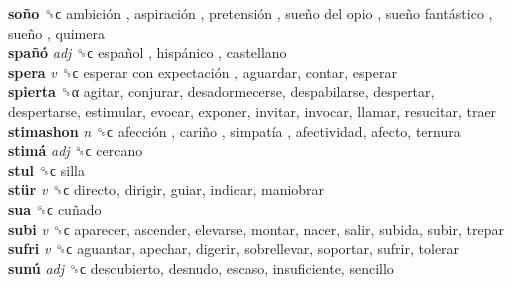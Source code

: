 \textbf{soño} ␝ϲ   ambición ,  aspiración ,  pretensión ,  sueño del opio ,  sueño fantástico ,  sueño , quimera  \\
\textbf{spañó} \emph{adj}  ␝ϲ   español ,  hispánico , castellano  \\
\textbf{spera} \emph{v}  ␝ϲ   esperar con expectación , aguardar, contar, esperar  \\
\textbf{spierta} ␝α  agitar, conjurar, desadormecerse, despabilarse, despertar, despertarse, estimular, evocar, exponer, invitar, invocar, llamar, resucitar, traer  \\
\textbf{stimashon} \emph{n}  ␝ϲ   afección ,  cariño ,  simpatía , afectividad, afecto, ternura  \\
\textbf{stimá} \emph{adj}  ␝ϲ  cercano  \\
\textbf{stul} ␝ϲ  silla  \\
\textbf{stür} \emph{v}  ␝ϲ  directo, dirigir, guiar, indicar, maniobrar  \\
\textbf{sua} ␝ϲ   cuñado   \\
\textbf{subi} \emph{v}  ␝ϲ  aparecer, ascender, elevarse, montar, nacer, salir, subida, subir, trepar  \\
\textbf{sufri} \emph{v}  ␝ϲ  aguantar, apechar, digerir, sobrellevar, soportar, sufrir, tolerar  \\
\textbf{sunú} \emph{adj}  ␝ϲ  descubierto, desnudo, escaso, insuficiente, sencillo  \\
